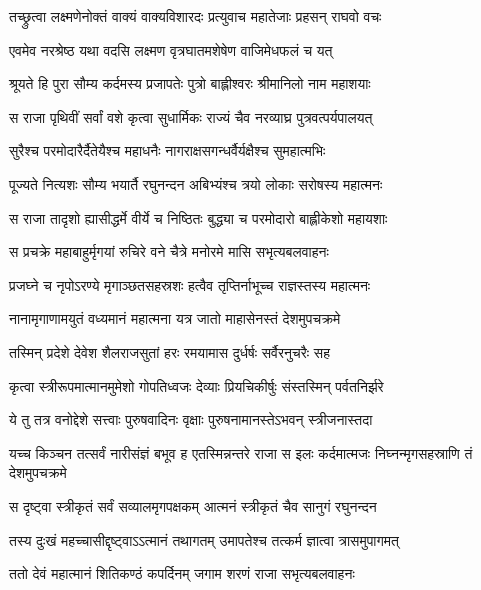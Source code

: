 
\twolineshloka
{तच्छ्रुत्वा लक्ष्मणेनोक्तं वाक्यं वाक्यविशारदः}
{प्रत्युवाच महातेजाः प्रहसन् राघवो वचः} %

\twolineshloka
{एवमेव नरश्रेष्ठ यथा वदसि लक्ष्मण}
{वृत्रघातमशेषेण वाजिमेधफलं च यत्} %

\twolineshloka
{श्रूयते हि पुरा सौम्य कर्दमस्य प्रजापतेः}
{पुत्रो बाह्लीश्वरः श्रीमानिलो नाम महाशयाः} %

\twolineshloka
{स राजा पृथिवीं सर्वां वशे कृत्वा सुधार्मिकः}
{राज्यं चैव नरव्याघ्र पुत्रवत्पर्यपालयत्} %

\twolineshloka
{सुरैश्च परमोदारैर्दैतेयैश्च महाधनैः}
{नागराक्षसगन्धर्वैर्यक्षैश्च सुमहात्मभिः} %

\twolineshloka
{पूज्यते नित्यशः सौम्य भयार्तै रघुनन्दन}
{अबिभ्यंश्च त्रयो लोकाः सरोषस्य महात्मनः} %

\twolineshloka
{स राजा तादृशो ह्यासीद्धर्मे वीर्ये च निष्ठितः}
{बुद्ध्या च परमोदारो बाह्लीकेशो महायशाः} %

\twolineshloka
{स प्रचक्रे महाबाहुर्मृगयां रुचिरे वने}
{चैत्रे मनोरमे मासि सभृत्यबलवाहनः} %

\twolineshloka
{प्रजघ्ने च नृपोऽरण्ये मृगाञ्छतसहस्रशः}
{हत्वैव तृप्तिर्नाभूच्च राज्ञस्तस्य महात्मनः} %

\twolineshloka
{नानामृगाणामयुतं वध्यमानं महात्मना}
{यत्र जातो माहासेनस्तं देशमुपचक्रमे} %

\twolineshloka
{तस्मिन् प्रदेशे देवेश शैलराजसुतां हरः}
{रमयामास दुर्धर्षः सर्वैरनुचरैः सह} %

\twolineshloka
{कृत्वा स्त्रीरूपमात्मानमुमेशो गोपतिध्वजः}
{देव्याः प्रियचिकीर्षुः संस्तस्मिन् पर्वतनिर्झरे} %

\twolineshloka
{ये तु तत्र वनोद्देशे सत्त्वाः पुरुषवादिनः}
{वृक्षाः पुरुषनामानस्तेऽभवन् स्त्रीजनास्तदा} %

\threelineshloka
{यच्च किञ्चन तत्सर्वं नारीसंज्ञं बभूव ह}
{एतस्मिन्नन्तरे राजा स इलः कर्दमात्मजः}
{निघ्नन्मृगसहस्राणि तं देशमुपचक्रमे} %

\twolineshloka
{स दृष्ट्वा स्त्रीकृतं सर्वं सव्यालमृगपक्षकम्}
{आत्मनं स्त्रीकृतं चैव सानुगं रघुनन्दन} %

\twolineshloka
{तस्य दुःखं महच्चासीद्दृष्ट्वाऽऽत्मानं तथागतम्}
{उमापतेश्च तत्कर्म ज्ञात्वा त्रासमुपागमत्} %

\twolineshloka
{ततो देवं महात्मानं शितिकण्ठं कपर्दिनम्}
{जगाम शरणं राजा सभृत्यबलवाहनः} %

